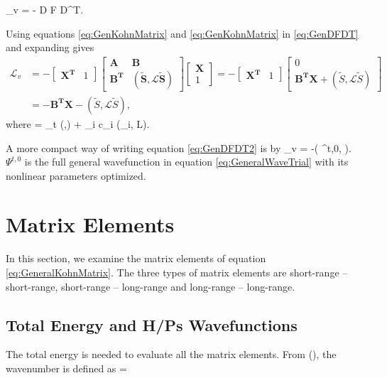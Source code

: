 \documentclass[Dissertation.tex]{subfiles}
\begin{document}
\beq
\label{eq:GenDFDT}
_v = - D F D^T.
\eeq

\noindent Using equations \ref{eq:GenKohnMatrix} and \ref{eq:GenKohnMatrix} in \ref{eq:GenDFDT} and expanding gives
\begin{align}
\label{eq:GenDFDT2}
\nonumber \mathcal{L}_v &= - 
\begin{bmatrix}
\boldsymbol{X^T} & 1 
\end{bmatrix}
\begin{bmatrix}
\boldsymbol{A} & \boldsymbol{B} \\
\boldsymbol{B^T} & \boldsymbol{(\tilde{S},\mathcal{L}\tilde{S})}
\end{bmatrix}
\begin{bmatrix}
\boldsymbol{X} \\
1
\end{bmatrix}
= -
\begin{bmatrix}
\boldsymbol{X^T} & 1 
\end{bmatrix}
\begin{bmatrix}
0 \\
\boldsymbol{B^T X} + (\tilde{S},\mathcal{L}\tilde{S})
\end{bmatrix} \\
&= -\boldsymbol{B^T X} - (\tilde{S},\mathcal{L}\tilde{S}),
\end{align}
where
\beq
{} = _t (,) + \sum_i c_i (\tilde{\phi}_i, L).
\eeq

\noindent A more compact way of writing equation \ref{eq:GenDFDT2} is by
\beq
{}_v = -\left( \Psi^{t,0},  \right).
\eeq
$\Psi^{t,0}$ is the full general wavefunction in equation \ref{eq:GeneralWaveTrial} with its nonlinear parameters optimized.



\section{Matrix Elements}
In this section, we examine the matrix elements of equation \ref{eq:GeneralKohnMatrix}. The three types of matrix elements are short-range -- short-range, short-range -- long-range and long-range -- long-range.

\subsection{Total Energy and H/Ps Wavefunctions}
The total energy is needed to evaluate all the matrix elements. From (\cite{}), the wavenumber is defined as
\beq
\kappa = 
\label{eq:Wavenumber}
\eeq
\end{document}
